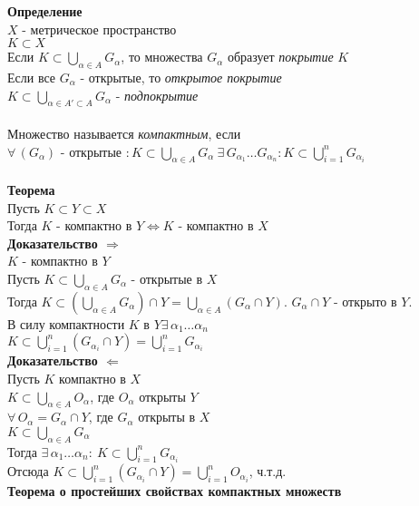 \documentclass[12pt]{article}
\begin{document}
\textbf{Определение}\\
$X$ - метрическое пространство\\
$K\subset X$\\
Если $K \subset \bigcup_{\alpha \in A} G_\alpha$, то множества $G_\alpha$ образует \textit{покрытие} $K$\\
Если все $G_\alpha$ - открытые, то \textit{открытое покрытие}\\
$K \subset \bigcup_{\alpha \in A' \subset A} G_\alpha $ - \textit{подпокрытие}\\\\
Множество называется \textit{компактным}, если \\
$\forall\,(G_\alpha)$ - открытые $: K \subset \bigcup_{\alpha \in A} G_\alpha\ \exists\,G_{\alpha_1}\ldots G_{\alpha_n}: K \subset \bigcup_{i=1}^n G_{\alpha_i}$\\\\
\textbf{Теорема}\\
Пусть $K\subset Y \subset X$\\
Тогда $K$ - компактно в $Y \Leftrightarrow K$ - компактно в $X$\\
\textbf{Доказательство $\Rightarrow$}\\
$K$ - компактно в $Y$\\
Пусть $K \subset \bigcup_{\alpha \in A} G_\alpha$ - открытые в $X$\\
Тогда $K \subset (\bigcup_{\alpha \in A} G_\alpha) \cap Y = \bigcup_{\alpha \in A} (G_\alpha \cap Y)$. $G_\alpha \cap Y$ - открыто в $Y$.\\
В силу компактности $K$ в $Y \exists\,\alpha_1\ldots\alpha_n$\\
$K \subset \bigcup_{i=1}^n (G_{\alpha_i} \cap Y) = \bigcup_{i=1}^n G_{\alpha_i}$\\
\textbf{Доказательство $\Leftarrow$}\\
Пусть $K$ компактно в $X$\\
$K \subset \bigcup_{\alpha\in A} O_\alpha$, где $O_\alpha$ открыты $Y$\\
$\forall\,O_\alpha =G_\alpha \cap Y$, где $G_\alpha$ открыты в $X$\\
$K \subset \bigcup_{\alpha \in A} G_\alpha$\\
Тогда $\exists\,\alpha_1\ldots\alpha_n:\ K \subset \bigcup_{i=1}^n G_{\alpha_i}$\\
Отсюда $K \subset \bigcup_{i=1}^n (G_{\alpha_i} \cap Y) = \bigcup_{i=1}^n O_{\alpha_i}$, ч.т.д.\\
\textbf{Теорема о простейших свойствах компактных множеств}\\
\end{document}
